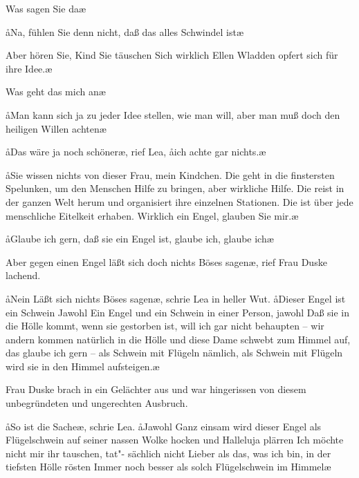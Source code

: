 \aanah{}Was sagen Sie da\frag{}\ae{}

\aa{}Na, fühlen Sie denn nicht, daß das alles Schwindel ist\frag{}\ae{}

\aanah{}Aber hören Sie, Kind\ausr{} Sie täuschen Sich\eingriff{eS64-1}{Sich ] sich} wirklich\ausr{} Ellen
Wladden opfert sich für ihre Idee.\ae{}

\aanah{}Was geht das mich an\ausr{}\ae{}

\aa{}Man kann sich ja zu jeder Idee stellen, wie man will, aber man
muß doch den heiligen Willen achten\ausr{}\ae{}

\aa{}Das wäre ja noch schöner\ae{},\eingriff{eS65-1}{schöner\ae{}, ] schöner,\ae{}} rief Lea, \aa{}ich achte gar nichts.\ae{}

\aa{}Sie wissen nichts von dieser Frau, mein Kindchen. Die geht
in die finstersten Spelunken, um den Menschen Hilfe zu
bringen, aber wirkliche Hilfe. Die reist in der ganzen Welt
herum und organisiert ihre einzelnen Stationen. Die ist über
jede menschliche Eitelkeit erhaben. Wirklich ein Engel, glauben
Sie mir.\ae{}

\aa{}Glaube ich gern, daß sie ein Engel ist, glaube ich, glaube ich\ausr{}\ae{}

\aanah{}Aber gegen einen Engel läßt sich doch nichts Böses sagen\frag{}\ae{},
rief Frau Duske lachend.

\aa{}Nein\frag{} Läßt sich nichts Böses sagen\frag{}\ae{}, schrie Lea in heller
Wut. \aa{}Dieser Engel ist ein Schwein\ausr{} Jawohl\ausr{} Ein Engel und
ein Schwein in einer Person, jawohl\ausr{} Daß sie in die Hölle
kommt, wenn sie gestorben ist, will ich gar nicht behaupten --
wir andern kommen natürlich in die Hölle und diese Dame
schwebt zum Himmel auf, das glaube ich gern -- als Schwein
mit Flügeln nämlich, als Schwein mit Flügeln wird sie in den
Himmel aufsteigen.\ae{}

Frau Duske brach in ein Gelächter aus und war hingerissen
von diesem unbegründeten und ungerechten Ausbruch.

\aa{}So ist die Sache\ausr{}\ae{}, schrie Lea. \aa{}Jawohl\ausr{} Ganz einsam wird
dieser Engel als Flügelschwein auf seiner nassen Wolke hocken
und Halleluja plärren\ausr{} Ich möchte nicht mir ihr tauschen, tat"-%
sächlich nicht\ausr{} Lieber als das, was ich bin, in der tiefsten Hölle
rösten\ausr{} Immer noch besser als solch Flügelschwein im
Himmel\ausr{}\ae{}

